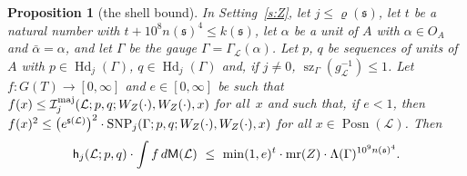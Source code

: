\documentclass[11pt,a4paper]{article}
\newcommand{\m}[1]{\mbox{$#1$}}        %
\theoremstyle{plainx}
\newtheorem{proposition}[theorem]{Proposition}
\theoremstyle{uprightx}
\newcommand{\fs}{\mathfrak{s}}                      %
\newcommand{\cL}{\mathcal{L}}                       %
\newcommand{\rh}[1]{\varrho(#1)}                    %
\newcommand{\kk}[1]{k(#1)}                          %
\newcommand{\nn}[1]{n(#1)}                          %
\newcommand{\GT}[1]{G(#1)}                          %
\newcommand{\gL}[1]{g_{#1}}                         %
\newcommand{\Posn}[1]{\operatorname{Posn}(#1)}      %
\newcommand{\stdg}[2]{\Gamma_{#1}(#2)}              %
\newcommand{\Lam}[1]{\Lambda(#1)}                   %
\newcommand{\szl}[3]{\operatorname{sz}_{#1}(#2)\le #3} %
\newcommand{\Hd}[3]{#3\in\operatorname{Hd}_{#2}(#1)} %
\newcommand{\gM}[1]{\mathsf{M}(#1)}                 %
\newcommand{\vexp}[1]{\mathsf{s}(#1)}               %
\newcommand{\hdens}[4]{\mathsf{h}_{#2}(#1;#3,#4)}   %
\newcommand{\fmaj}[7]{\mathcal{I}^{\mathrm{maj}}_{#2}(#1;#3,#4;#5,#6,#7)} %
\newcommand{\snp}[7]{\operatorname{SNP}_{#2}(#1;#3,#4;#5,#6,#7)} %
\begin{document}
\begin{proposition}[the shell bound]\label{p:shells}
In Setting~\ref{s:Z}, let \m{j\le\rh{\fs}}, let $t$ be a natural number with \m{t+10^{8}\nn{\fs}^4\le\kk{\fs}}, let
$\alpha$ be a unit of $A$ with \m{\alpha\in O_A} and \m{\bar\alpha=\alpha}, and let $\Gamma$ be the gauge
\m{\Gamma=\stdg{\cL}{\alpha}}. Let $p$, $q$ be sequences of units of $A$ with \m{\Hd{\Gamma}{j}{p}}, \m{\Hd{\Gamma}{j}{q}}
and, if \m{j\ne0}, \m{\szl{\Gamma}{\gL{\cL}^{-1}}{1}}. Let \m{f\colon\GT{T}\to[0,\infty]} and \m{e\in[0,\infty]} be such
that \m{f(x)\le\fmaj{\cL}{j}{p}{q}{\bvec{Z}{\cdot}}{\bvec{Z}{\cdot}}{x}} for all~$x$ and such that, if \m{e<1}, then
\m{f(x)^2\le\bigl(e^{\vexp{\cL}}\bigr)^2\cdot\snp{\Gamma}{j}{p}{q}{\bvec{Z}{\cdot}}{\bvec{Z}{\cdot}}{x}} for all
\m{x\in\Posn{\cL}}. Then
\[\hdens{\cL}{j}{p}{q}\cdot\int f\,d\gM{\cL}\ \le\ \min(1,e)^{t}\cdot\mr{Z}\cdot\Lam{\Gamma}^{10^{9}\nn{\fs}^4}.\]
\end{proposition}
\end{document}
